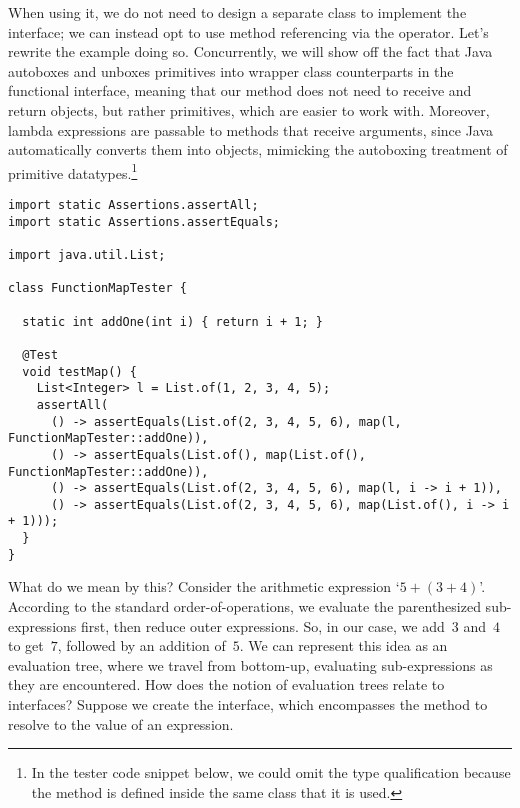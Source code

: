When using it, we do not need to design a separate  class to implement the interface; we can instead opt to use method referencing via the \ttt{::} operator. 
Let's rewrite the  example doing so. 
Concurrently, we will show off the fact that Java autoboxes and unboxes primitives into wrapper class counterparts in the functional interface, meaning that our  method does not need to receive and return objects, but rather primitives, which are easier to work with. 
Moreover, lambda expressions are passable to methods that receive  arguments, since Java automatically converts them into  objects, mimicking the autoboxing treatment of primitive datatypes.\footnote{In the tester code snippet below, we could omit the  type qualification because the method is defined inside the same class that it is used.}

\enlargethispage{-6\baselineskip}
\begin{lstlisting}[language=MyJava]
import static Assertions.assertAll;
import static Assertions.assertEquals;

import java.util.List;

class FunctionMapTester {

  static int addOne(int i) { return i + 1; }

  @Test
  void testMap() {
    List<Integer> l = List.of(1, 2, 3, 4, 5);
    assertAll(
      () -> assertEquals(List.of(2, 3, 4, 5, 6), map(l, FunctionMapTester::addOne)),
      () -> assertEquals(List.of(), map(List.of(), FunctionMapTester::addOne)),
      () -> assertEquals(List.of(2, 3, 4, 5, 6), map(l, i -> i + 1)),
      () -> assertEquals(List.of(2, 3, 4, 5, 6), map(List.of(), i -> i + 1)));
  }
}
\end{lstlisting}

What do we mean by this? 
Consider the arithmetic expression `$5 + (3 + 4)$'. 
According to the standard order-of-operations, we evaluate the parenthesized sub-expressions first, then reduce outer expressions. 
So, in our case, we add~$3$ and~$4$ to get~$7$, followed by an addition of~$5$. 
We can represent this idea as an evaluation tree, where we travel from bottom-up, evaluating sub-expressions as they are encountered. 
How does the notion of evaluation trees relate to interfaces? 
Suppose we create the  interface, which encompasses the  method to resolve to the value of an expression.

